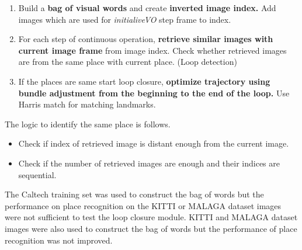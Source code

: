 \begin{enumerate}
\item Build a \textbf{bag of visual words} and create \textbf{inverted image index.} Add images which are used for \textit{initialiveVO} step frame to index.
\item For each step of continuous operation, \textbf{retrieve similar images with current image frame} from image index. Check whether retrieved images are from the same place with current place. (Loop detection)
\item If the places are same start loop closure, \textbf{optimize trajectory using bundle adjustment from the beginning to the end of the loop.} Use Harris match for matching landmarks.
\end{enumerate}

The logic to identify the same place is follows.

\begin{itemize}
\item Check if index of retrieved image is distant enough from the current image.
\item Check if the number of retrieved images are enough and their indices are sequential.  
\end{itemize}

The Caltech training set\cite{cvprFei} was used to construct the bag of words but the performance on place recognition on the KITTI or MALAGA dataset images were not sufficient to test the loop closure module. KITTI and MALAGA dataset images were also used to construct the bag of words but the performance of place recognition was not improved. 